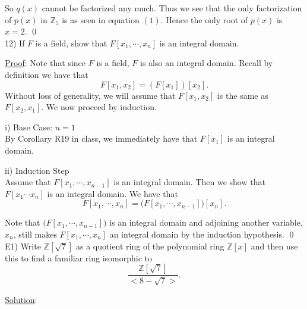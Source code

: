 \documentclass{article}
\begin{document}
So $q(x)$ cannot be factorized any much. Thus we see that the only factorization of $p(x)$ in $\mathbb{Z}_5$ is as seen in equation $(1)$. Hence the only root of $p(x)$ is $x = 2$. \qed \\

12) If $F$ is a field, show that $F[x_1, \cdots, x_n]$ is an integral domain.

\underline{Proof}: Note that since $F$ is a field, $F$ is also an integral domain. Recall by definition we have that $$F[x_1, x_2] = (F[x_1])[x_2].$$ Without loss of generality, we will assume that $F[x_1, x_2]$ is the same as $F[x_2, x_1]$. We now proceed by induction.

i) Base Case: $n = 1$ \\
By Corollary R19 in class, we immediately have that $F[x_1]$ is an integral domain.

ii) Induction Step \\
Assume that $F[x_1, \cdots, x_{n-1}]$ is an integral domain. Then we show that $F[x_1 \cdots x_n]$ is an integral domain. We have that
$$ F[x_1, \cdots, x_n] = \big( F[x_1, \cdots ,x_{n-1}] \big) [x_n].$$

Note that $\big(F[x_1, \cdots ,x_{n-1}]\big)$ is an integral domain and adjoining another variable, $x_n$, still makes $F[x_1, \cdots ,x_n]$ an integral domain by the induction hypothesis. \qed \\

E1) Write $\mathbb{Z}[\sqrt{7}]$ as a quotient ring of the polynomial ring $\mathbb{Z}[x]$ and then use this to find a familiar ring isomorphic to
$$\frac{\mathbb{Z}[\sqrt{7}]}{<8-\sqrt{7}>}.$$

\underline{Solution}:
\end{document}
